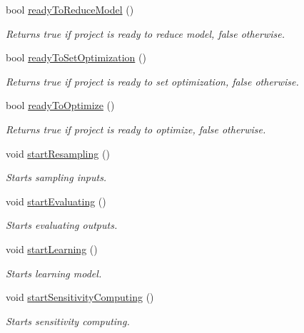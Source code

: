 \begin{DoxyCompactItemize}
bool \hyperlink{class_go_s_u_m_1_1_c_container_a4edc8dbed2d0c4cadb1993138b2cb190}{ready\-To\-Reduce\-Model} ()
\begin{DoxyCompactList}\small\item\em Returns true if project is ready to reduce model, false otherwise. \end{DoxyCompactList}\item 
bool \hyperlink{class_go_s_u_m_1_1_c_container_aeec60b71785278d9418283d68a59e6b1}{ready\-To\-Set\-Optimization} ()
\begin{DoxyCompactList}\small\item\em Returns true if project is ready to set optimization, false otherwise. \end{DoxyCompactList}\item 
bool \hyperlink{class_go_s_u_m_1_1_c_container_a195e79fdea4b67d519c5436a22eb31f2}{ready\-To\-Optimize} ()
\begin{DoxyCompactList}\small\item\em Returns true if project is ready to optimize, false otherwise. \end{DoxyCompactList}\item 
void \hyperlink{class_go_s_u_m_1_1_c_container_af28a3e032bb395353a6df1d40ee7a109}{start\-Resampling} ()
\begin{DoxyCompactList}\small\item\em Starts sampling inputs. \end{DoxyCompactList}\item 
void \hyperlink{class_go_s_u_m_1_1_c_container_a99a6e723340daeece6ba3d2cb98cfb93}{start\-Evaluating} ()
\begin{DoxyCompactList}\small\item\em Starts evaluating outputs. \end{DoxyCompactList}\item 
void \hyperlink{class_go_s_u_m_1_1_c_container_a788f9bc7fb6b5dddf230046d03bd6152}{start\-Learning} ()
\begin{DoxyCompactList}\small\item\em Starts learning model. \end{DoxyCompactList}\item 
void \hyperlink{class_go_s_u_m_1_1_c_container_a434f9d0a1e255330c975a8142829a4a7}{start\-Sensitivity\-Computing} ()
\begin{DoxyCompactList}\small\item\em Starts sensitivity computing. \end{DoxyCompactList}\item 

\end{DoxyCompactItemize}

